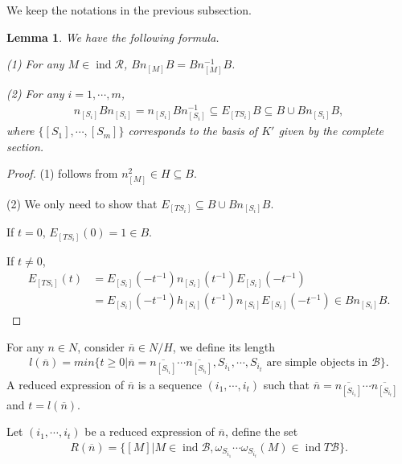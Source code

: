 \documentclass[12pt]{amsart}
\newtheorem{lemma}[theorem]{Lemma}
\begin{document}
We keep the notations in the previous subsection.

\begin{lemma}\label{nBn}
    We have the following formula.

    (1) For any $M\in \operatorname{ind}\mathcal{R}$, $Bn_{[M]}B = Bn_{[M]}^{-1}B$.

    (2) For any $i=1,\cdots,m$, 
    \begin{align*}
        n_{[S_i]}Bn_{[S_i]} = n_{[S_i]}Bn_{[S_i]}^{-1} \subseteq  E_{[TS_i]}B \subseteq  B\cup Bn_{[S_i]}B,
    \end{align*}
    where $\{ [S_1],\cdots,[S_m]\}$ corresponds to the basis of $K'$ given by the complete section.
    
\end{lemma}

\begin{proof}
    (1) follows from $n_{[M]}^2 \in H \subseteq  B$.

    (2) We only need to show that $E_{[TS_i]}\subseteq  B\cup Bn_{[S_i]}B$.

    If $t=0$, $E_{[TS_i]}(0) = 1 \in B$.

    If $t \neq 0$, 
    \begin{align*}
        E_{[TS_i]}(t) &= E_{[S_i]}(-t^{-1}) n_{[S_i]}(t^{-1}) E_{[S_i]}(-t^{-1}) \\ 
              &= E_{[S_i]}(-t^{-1}) h_{[S_i]}(t^{-1}) n_{[S_i]}  E_{[S_i]}(-t^{-1}) \in Bn_{[S_i]}B.
    \end{align*}
\end{proof}

For any $n\in N$, consider $\overline{n}\in N/H$, we define its length
\begin{align*}
    l(\overline{n}) = min\{ t \geq 0 | \overline{n} = \overline{n_{[S_{i_1}]}} \cdots \overline{n_{[S_{i_t}]}}, S_{i_1},\cdots,S_{i_t} \text{ are simple objects in } \mathcal{B} \}.
\end{align*}
A reduced expression of $\overline{n}$ is a sequence $(i_1,\cdots,i_t)$ such that $\overline{n} = \overline{n_{[S_{i_1}]}} \cdots \overline{n_{[S_{i_t}]}}$ and $t=l(\overline{n})$.

Let  $(i_1,\cdots,i_t)$ be a reduced expression of $\overline{n}$, define the set
\begin{align*}
    R(\overline{n}) = \{  [M] | M\in \operatorname{ind}\mathcal{B}, \omega_{S_{i_1}}\cdots \omega_{S_{i_t}}(M) \in \operatorname{ind}T\mathcal{B}    \}.
\end{align*}
\end{document}

